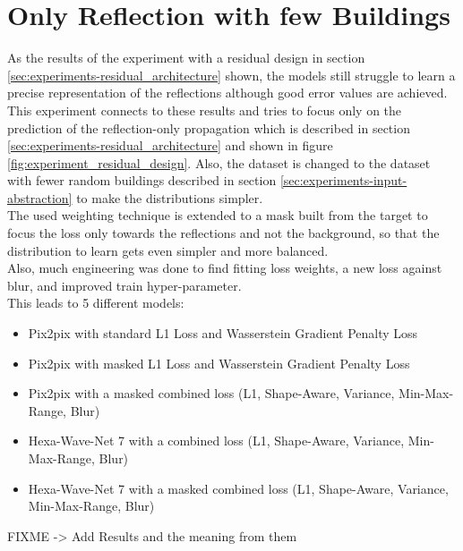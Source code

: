 	\section{Only Reflection with few Buildings}
	\label{sec:experiments-only_reflections_with_few_buildings}
		As the results of the experiment with a residual design in section \ref{sec:experiments-residual_architecture} shown, the models still struggle to learn a precise representation of the reflections although good error values are achieved. This experiment connects to these results and tries to focus only on the prediction of the reflection-only propagation which is described in section \ref{sec:experiments-residual_architecture} and shown in figure \ref{fig:experiment_residual_design}. Also, the dataset is changed to the dataset with fewer random buildings described in section \ref{sec:experiments-input-abstraction} to make the distributions simpler.\\
		The used weighting technique is extended to a mask built from the target to focus the loss only towards the reflections and not the background, so that the distribution to learn gets even simpler and more balanced.\\
		Also, much engineering was done to find fitting loss weights, a new loss against blur, and improved train hyper-parameter. \\
		This leads to 5 different models:
		\begin{itemize}[itemsep=1mm, parsep=0pt]
			\item Pix2pix with standard L1 Loss and Wasserstein Gradient Penalty Loss
			\item Pix2pix with masked L1 Loss and Wasserstein Gradient Penalty Loss
			\item Pix2pix with a masked combined loss (L1, Shape-Aware, Variance, Min-Max-Range, Blur)
			\item Hexa-Wave-Net 7 with a combined loss (L1, Shape-Aware, Variance, Min-Max-Range, Blur)
			\item Hexa-Wave-Net 7 with a masked combined loss (L1, Shape-Aware, Variance, Min-Max-Range, Blur)
		\end{itemize}
		
		
		
		FIXME -> Add Results and the meaning from them
		
	
	
	

